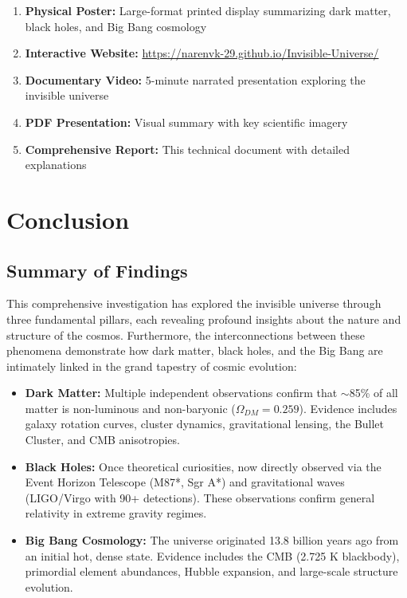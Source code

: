 \documentclass[11pt,a4paper]{article}
\begin{document}
\begin{enumerate}[noitemsep]
    \item \textbf{Physical Poster:} Large-format printed display summarizing dark matter, black holes, and Big Bang cosmology
    \item \textbf{Interactive Website:} \url{https://narenvk-29.github.io/Invisible-Universe/}
    \item \textbf{Documentary Video:} 5-minute narrated presentation exploring the invisible universe
    \item \textbf{PDF Presentation:} Visual summary with key scientific imagery
    \item \textbf{Comprehensive Report:} This technical document with detailed explanations
\end{enumerate}

\newpage

\section{Conclusion}
\label{sec:conclusion}

\subsection{Summary of Findings}

This comprehensive investigation has explored the invisible universe through three fundamental pillars, each revealing profound insights about the nature and structure of the cosmos. Furthermore, the interconnections between these phenomena demonstrate how dark matter, black holes, and the Big Bang are intimately linked in the grand tapestry of cosmic evolution:

\begin{itemize}[noitemsep]
    \item \textbf{Dark Matter:} Multiple independent observations confirm that $\sim$85\% of all matter is non-luminous and non-baryonic ($\Omega_{DM} = 0.259$). Evidence includes galaxy rotation curves, cluster dynamics, gravitational lensing, the Bullet Cluster, and CMB anisotropies.

    \item \textbf{Black Holes:} Once theoretical curiosities, now directly observed via the Event Horizon Telescope (M87*, Sgr A*) and gravitational waves (LIGO/Virgo with 90+ detections). These observations confirm general relativity in extreme gravity regimes.

    \item \textbf{Big Bang Cosmology:} The universe originated 13.8 billion years ago from an initial hot, dense state. Evidence includes the CMB (2.725 K blackbody), primordial element abundances, Hubble expansion, and large-scale structure evolution.
\end{itemize}
\end{document}
